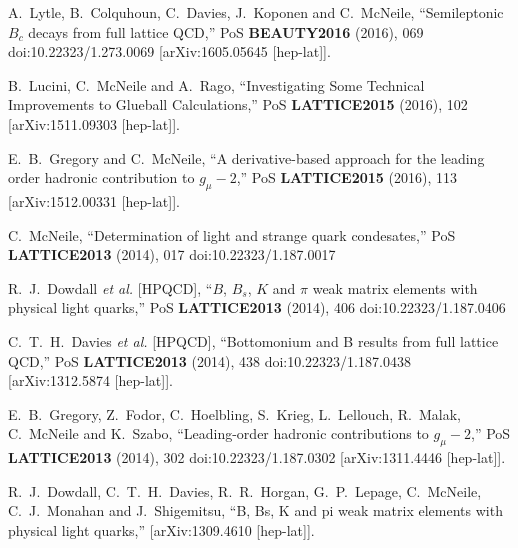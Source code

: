 \begin{thebibliography}{130}
A.~Lytle, B.~Colquhoun, C.~Davies, J.~Koponen and C.~McNeile,
``Semileptonic $B_c$ decays from full lattice QCD,''
PoS \textbf{BEAUTY2016} (2016), 069
doi:10.22323/1.273.0069
[arXiv:1605.05645 [hep-lat]].

B.~Lucini, C.~McNeile and A.~Rago,
``Investigating Some Technical Improvements to Glueball
Calculations,''
PoS \textbf{LATTICE2015} (2016), 102
[arXiv:1511.09303 [hep-lat]].


E.~B.~Gregory and C.~McNeile,
``A derivative-based approach for the leading order hadronic
contribution to $g_\mu-2$,''
PoS \textbf{LATTICE2015} (2016), 113
[arXiv:1512.00331 [hep-lat]].

C.~McNeile,
``Determination of light and strange quark condesates,''
PoS \textbf{LATTICE2013} (2014), 017
doi:10.22323/1.187.0017

R.~J.~Dowdall \textit{et al.} [HPQCD],
``$B$, $B_s$, $K$ and $\pi$  weak matrix elements with physical light
quarks,''
PoS \textbf{LATTICE2013} (2014), 406
doi:10.22323/1.187.0406

C.~T.~H.~Davies \textit{et al.} [HPQCD],
``Bottomonium and B results from full lattice QCD,''
PoS \textbf{LATTICE2013} (2014), 438
doi:10.22323/1.187.0438
[arXiv:1312.5874 [hep-lat]].

E.~B.~Gregory, Z.~Fodor, C.~Hoelbling, S.~Krieg, L.~Lellouch,
R.~Malak, C.~McNeile and K.~Szabo,
``Leading-order hadronic contributions to $g_\mu-2$,''
PoS \textbf{LATTICE2013} (2014), 302
doi:10.22323/1.187.0302
[arXiv:1311.4446 [hep-lat]].


R.~J.~Dowdall, C.~T.~H.~Davies, R.~R.~Horgan, G.~P.~Lepage,
C.~McNeile, C.~J.~Monahan and J.~Shigemitsu,
``B, Bs, K and pi weak matrix elements with physical light quarks,''
[arXiv:1309.4610 [hep-lat]].


\end{thebibliography}
